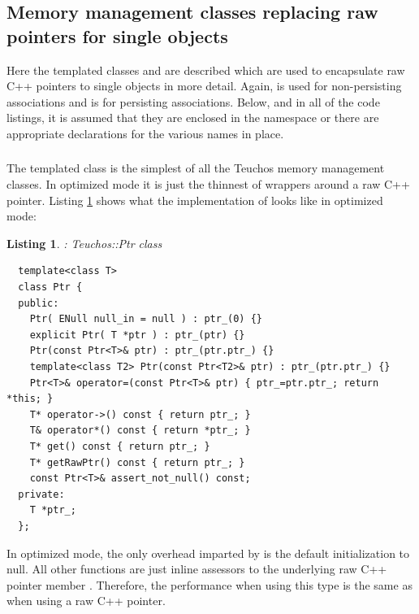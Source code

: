 \documentclass[pdf,ps2pdf,11pt]{SANDreport}
\newtheorem{listing}{Listing}
\begin{document}


%
{}\subsection{Memory management classes replacing raw pointers for
single objects}
\label{sec:mem-mng-classes-single-objs}
%

Here the templated classes {} and {} are described
which are used to encapsulate raw C++ pointers to single objects in
more detail.  Again, {} is used for non-persisting
associations and {} is for persisting associations.  Below,
and in all of the code listings, it is assumed that they are enclosed
in the {} namespace or there are appropriate {} declarations for the various names in place.

%
{}\subsubsection{}
\label{sec:Ptr}
%

The templated class {} is the simplest of all the Teuchos
memory management classes.  In optimized mode it is just the thinnest
of wrappers around a raw C++ pointer.  Listing {}\ref{listing:Ptr}
shows what the implementation of {} looks like in
optimized mode:

\begin{listing}: Teuchos::Ptr class\\
\label{listing:Ptr}
{\small\begin{verbatim}
  template<class T>
  class Ptr {
  public:
    Ptr( ENull null_in = null ) : ptr_(0) {}
    explicit Ptr( T *ptr ) : ptr_(ptr) {}
    Ptr(const Ptr<T>& ptr) : ptr_(ptr.ptr_) {}
    template<class T2> Ptr(const Ptr<T2>& ptr) : ptr_(ptr.ptr_) {}
    Ptr<T>& operator=(const Ptr<T>& ptr) { ptr_=ptr.ptr_; return *this; }
    T* operator->() const { return ptr_; }
    T& operator*() const { return *ptr_; }
    T* get() const { return ptr_; }
    T* getRawPtr() const { return ptr_; }
    const Ptr<T>& assert_not_null() const;
  private:
    T *ptr_;
  };
\end{verbatim}}
\end{listing}

In optimized mode, the only overhead imparted by {} is the
default initialization to null.  All other functions are just inline
assessors to the underlying raw C++ pointer member {}.
Therefore, the performance when using this type is the same as when
using a raw C++ pointer.
\end{document}

